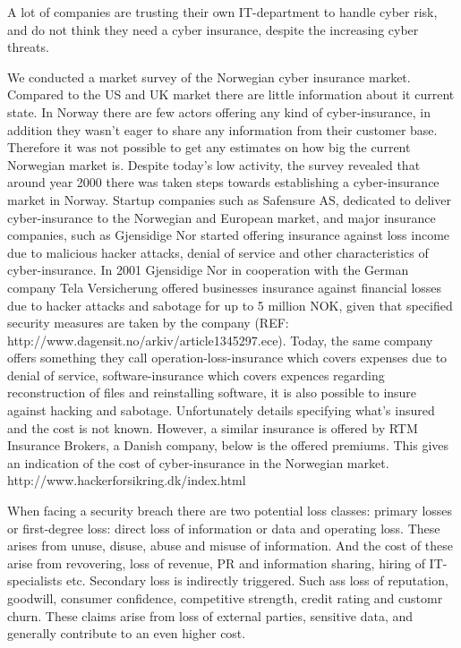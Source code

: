 A lot of companies are trusting their own IT-department to handle cyber risk, 
and do not think they need a cyber insurance, despite the increasing cyber threats. \cite{twatson}

We conducted a market survey of the Norwegian cyber insurance market. Compared to the US and UK market there are little information about it current state. 
In Norway there are few actors offering any kind of cyber-insurance, in addition they wasn't eager to share any information from their customer base.
Therefore it was not possible to get any estimates on how big the current Norwegian market is. Despite today's low activity, the survey revealed that around year 2000 there was taken steps towards establishing a cyber-insurance market in Norway. Startup companies such as Safensure AS, 
dedicated to deliver cyber-insurance to the Norwegian and European market, and major insurance companies, such as Gjensidige Nor
started offering insurance against loss income due to malicious hacker attacks, denial of service and other characteristics of cyber-insurance. 
In 2001 Gjensidige Nor in cooperation with the German company Tela Versicherung offered businesses insurance against financial losses due to hacker attacks and sabotage for up to 5 million NOK, given that specified security measures are taken by the company (REF: http://www.dagensit.no/arkiv/article1345297.ece). Today, the same company 
offers something they call operation-loss-insurance which covers expenses due to denial of service, software-insurance which covers expences regarding reconstruction of files and reinstalling software, it is also possible to insure against hacking and sabotage. Unfortunately details specifying what's insured and the cost is not known. However, a similar insurance is offered by RTM Insurance Brokers, a Danish company, below is the offered premiums. This gives an indication of the cost of cyber-insurance in the Norwegian market. http://www.hackerforsikring.dk/index.html 






When facing a security breach there are two potential loss classes:
primary losses or first-degree loss: direct loss of information or data and operating loss. 
These arises from unuse, disuse, abuse and misuse of information.
 And the cost of these arise from revovering, loss of revenue, 
 PR and information sharing, hiring of IT-specialists etc. 
Secondary loss is indirectly triggered. Such ass loss of reputation, goodwill, 
consumer confidence, competitive strength, credit rating and customr churn. 
These claims arise from loss of external parties, sensitive data, 
and generally contribute to an even higher cost. \cite{bandyopadhyay2009managers} 

